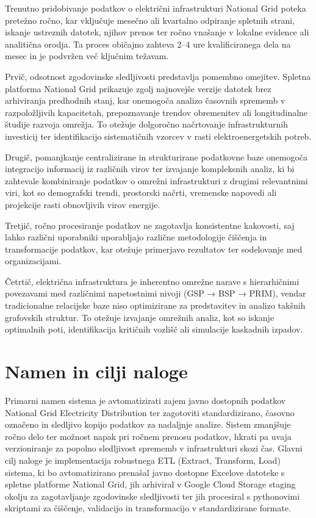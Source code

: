 \documentclass[a4paper,12pt,openright]{book}
\begin{document}
Trenutno pridobivanje podatkov o električni infrastrukturi National Grid poteka pretežno ročno, kar vključuje mesečno ali kvartalno odpiranje spletnih strani, iskanje ustreznih datotek, njihov prenos ter ročno vnašanje v lokalne evidence ali analitična orodja. Ta proces običajno zahteva 2–4 ure kvalificiranega dela na mesec in je podvržen več ključnim težavam.

Prvič, odsotnost zgodovinske sledljivosti predstavlja pomembno omejitev. Spletna platforma National Grid prikazuje zgolj najnovejše verzije datotek brez arhiviranja predhodnih stanj, kar onemogoča analizo časovnih sprememb v razpoložljivih kapacitetah, prepoznavanje trendov obremenitev ali longitudinalne študije razvoja omrežja. To otežuje dolgoročno načrtovanje infrastrukturnih investicij ter identifikacijo sistematičnih vzorcev v rasti elektroenergetskih potreb.

Drugič, pomanjkanje centralizirane in strukturirane podatkovne baze onemogoča integracijo informacij iz različnih virov ter izvajanje kompleksnih analiz, ki bi zahtevale kombiniranje podatkov o omrežni infrastrukturi z drugimi relevantnimi viri, kot so demografski trendi, prostorski načrti, vremenske napovedi ali projekcije rasti obnovljivih virov energije.

Tretjič, ročno procesiranje podatkov ne zagotavlja konsistentne kakovosti, saj lahko različni uporabniki uporabljajo različne metodologije čiščenja in transformacije podatkov, kar otežuje primerjavo rezultatov ter sodelovanje med organizacijami.

Četrtič, električna infrastruktura je inherentno omrežne narave s hierarhičnimi povezavami med različnimi napetostnimi nivoji (GSP → BSP → PRIM), vendar tradicionalne relacijske baze niso optimizirane za predstavitev in analizo takšnih grafovskih struktur. To otežuje izvajanje omrežnih analiz, kot so iskanje optimalnih poti, identifikacija kritičnih vozlišč ali simulacije kaskadnih izpadov.

\section{Namen in cilji naloge}

Primarni namen sistema je avtomatizirati zajem javno dostopnih podatkov National Grid Electricity Distribution ter zagotoviti standardizirano, časovno označeno in sledljivo kopijo podatkov za nadaljnje analize. Sistem zmanjšuje ročno delo ter možnost napak pri ročnem prenosu podatkov, hkrati pa uvaja verzioniranje za popolno sledljivost sprememb v infrastrukturi skozi čas. Glavni cilj naloge je implementacija robustnega ETL (Extract, Transform, Load) sistema, ki bo avtomatizirano prenašal javno dostopne Excelove datoteke s spletne platforme National Grid, jih arhiviral v Google Cloud Storage staging okolju za zagotavljanje zgodovinske sledljivosti ter jih procesiral s pythonovimi skriptami za čiščenje, validacijo in transformacijo v standardizirane formate.
\end{document}
